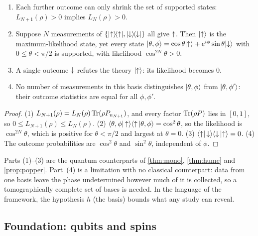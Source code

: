 \begin{proposition}\label{prop:qhume}
\leavevmode
\begin{enumerate}
  \item Each further outcome can only shrink the set of supported states:
        $L_{N+1}(\rho)>0$ implies $L_N(\rho)>0$.
  \item Suppose $N$ measurements of $\{\lvert {\uparrow}\rangle\!\langle {\uparrow}\rvert,\lvert {\downarrow}\rangle\!\langle {\downarrow}\rvert\}$ all give ${\uparrow}$.
        Then $\lvert {\uparrow}\rangle$ is the maximum-likelihood state, yet every state
        $\lvert \theta,\phi\rangle=\cos\theta\lvert {\uparrow}\rangle+e^{i\phi}\sin\theta\lvert {\downarrow}\rangle$ with $0\le\theta<\pi/2$
        is supported, with likelihood $\cos^{2N}\theta>0$.
  \item A single outcome ${\downarrow}$ refutes the theory $\lvert {\uparrow}\rangle$: its likelihood becomes $0$.
  \item No number of measurements in this basis distinguishes $\lvert \theta,\phi\rangle$ from
        $\lvert \theta,\phi'\rangle$: their outcome statistics are equal for all $\phi,\phi'$.
\end{enumerate}
\end{proposition}

\begin{proof}
(1) $L_{N+1}(\rho)=L_N(\rho)\operatorname{Tr}(\rho P_{n_{N+1}})$, and every factor $\operatorname{Tr}(\rho P)$ lies in
$[0,1]$, so $0\le L_{N+1}(\rho)\le L_N(\rho)$.
(2) $\langle \theta,\phi\rvert\,{\uparrow}\rangle\langle{\uparrow}\,\lvert \theta,\phi\rangle=\cos^2\theta$, so the likelihood is
$\cos^{2N}\theta$, which is positive for $\theta<\pi/2$ and largest at $\theta=0$.
(3) $\langle {\uparrow}\rvert\,{\downarrow}\rangle\langle{\downarrow}\,\lvert {\uparrow}\rangle=0$.
(4) The outcome probabilities are $\cos^2\theta$ and $\sin^2\theta$, independent of $\phi$.
\end{proof}

Parts (1)--(3) are the quantum counterparts of \cref{thm:mono}, \cref{thm:hume} and
\cref{prop:popper}. Part~(4) is a limitation with no classical counterpart: data from one basis
leave the phase undetermined however much of it is collected, so a tomographically complete set
of bases is needed. In the language of the framework, the hypothesis $h$ (the basis) bounds what
any study can reveal.

\subsection{Foundation: qubits and spins}

